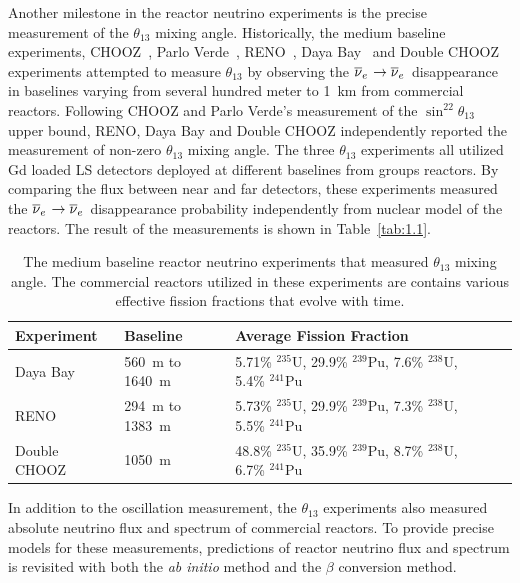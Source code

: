     Another milestone in the reactor neutrino experiments is the precise measurement of the $\theta_{13}$ mixing angle. 
    Historically, the medium baseline experiments, CHOOZ~\cite{bib:chooz03}, Parlo Verde~\cite{bib:palo2000}, RENO~\cite{bib:RENO}, Daya Bay~\cite{bib:DYBosc} and Double CHOOZ~\cite{bib:DBChooz} experiments attempted to measure $\theta_{13}$ by observing the $\overline{\nu }_{e}\hspace{1pt}\rightarrow\overline{\nu }_{e}\hspace{1pt}$ disappearance in baselines varying from several hundred meter to 1~km from commercial reactors.
    Following CHOOZ and Parlo Verde's measurement of the $\sin^22\theta_{13}$ upper bound, RENO, Daya Bay and Double CHOOZ independently reported the measurement of non-zero $\theta_{13}$ mixing angle.
    The three $\theta_{13}$ experiments all utilized Gd loaded LS detectors deployed at different baselines from groups reactors.
    By comparing the \nuebar flux between near and far detectors, these experiments measured the $\overline{\nu }_{e}\hspace{1pt}\rightarrow\overline{\nu }_{e}\hspace{1pt}$ disappearance probability independently from nuclear model of the reactors.
    The result of the measurements is shown in Table~\ref{tab:1.1}.
    \begin{table}[h]
    \centering
    \begin{tabular}{lllll}
    \hline
    Experiment  & Baseline   & Average Fission Fraction   \\ 
    \hline
    Daya Bay     & 560~m to 1640~m  & 5.71\% $^{235}$U, 29.9\% $^{239}$Pu, 7.6\% $^{238}$U, 5.4\% $^{241}$Pu \\
    \hline
    RENO     & 294~m to 1383~m & 5.73\% $^{235}$U, 29.9\% $^{239}$Pu, 7.3\% $^{238}$U, 5.5\% $^{241}$Pu \\
    \hline
    Double CHOOZ    & 1050~m & 48.8\% $^{235}$U, 35.9\% $^{239}$Pu, 8.7\% $^{238}$U, 6.7\% $^{241}$Pu \\
    \hline
    \hline
    \end{tabular}
    \caption[$\theta_{13}$ reactor experiments]{The medium baseline reactor neutrino experiments that measured $\theta_{13}$ mixing angle.
    The commercial reactors utilized in these experiments are contains various effective fission fractions that evolve with time.}
    \label{tab:theta13}
    \end{table}

\label{c2s3}
        
    In addition to the oscillation measurement, the $\theta_{13}$ experiments also measured absolute neutrino flux and spectrum of commercial reactors. 
    To provide precise models for these measurements, predictions of reactor neutrino flux and spectrum is revisited with both the \textit{ab initio} method and the $\beta$ conversion method.
    
